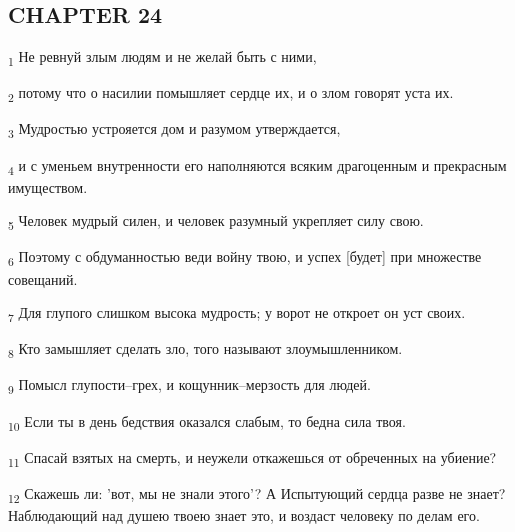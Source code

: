 \subsection{CHAPTER 24}
\begin{tcolorbox}
\textsubscript{1} Не ревнуй злым людям и не желай быть с ними,
\end{tcolorbox}
\begin{tcolorbox}
\textsubscript{2} потому что о насилии помышляет сердце их, и о злом говорят уста их.
\end{tcolorbox}
\begin{tcolorbox}
\textsubscript{3} Мудростью устрояется дом и разумом утверждается,
\end{tcolorbox}
\begin{tcolorbox}
\textsubscript{4} и с уменьем внутренности его наполняются всяким драгоценным и прекрасным имуществом.
\end{tcolorbox}
\begin{tcolorbox}
\textsubscript{5} Человек мудрый силен, и человек разумный укрепляет силу свою.
\end{tcolorbox}
\begin{tcolorbox}
\textsubscript{6} Поэтому с обдуманностью веди войну твою, и успех [будет] при множестве совещаний.
\end{tcolorbox}
\begin{tcolorbox}
\textsubscript{7} Для глупого слишком высока мудрость; у ворот не откроет он уст своих.
\end{tcolorbox}
\begin{tcolorbox}
\textsubscript{8} Кто замышляет сделать зло, того называют злоумышленником.
\end{tcolorbox}
\begin{tcolorbox}
\textsubscript{9} Помысл глупости--грех, и кощунник--мерзость для людей.
\end{tcolorbox}
\begin{tcolorbox}
\textsubscript{10} Если ты в день бедствия оказался слабым, то бедна сила твоя.
\end{tcolorbox}
\begin{tcolorbox}
\textsubscript{11} Спасай взятых на смерть, и неужели откажешься от обреченных на убиение?
\end{tcolorbox}
\begin{tcolorbox}
\textsubscript{12} Скажешь ли: 'вот, мы не знали этого'? А Испытующий сердца разве не знает? Наблюдающий над душею твоею знает это, и воздаст человеку по делам его.
\end{tcolorbox}
